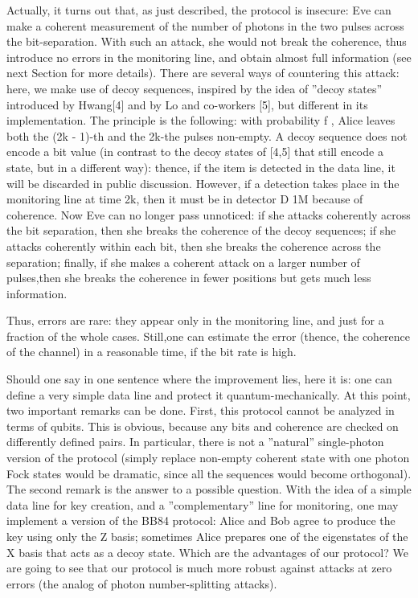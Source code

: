 Actually, it turns out that, as just described, the protocol is insecure: Eve can make a coherent measurement of the number of photons in the two pulses across the bit-separation. With such an attack, she would not break the coherence, thus introduce no errors in the monitoring line, and obtain almost full information (see next Section for more details). There are several ways of countering this attack: here, we make use of decoy sequences, inspired by the idea of ”decoy states” introduced by Hwang[4] and by Lo and co-workers [5], but different in its implementation. The principle is the following: with probability f , Alice leaves both the (2k - 1)-th and the 2k-the pulses non-empty. A decoy sequence does not encode a bit value (in contrast to the decoy states of [4,5] that still encode a state, but in a different way): thence, if the item is detected in the data line, it will be discarded in public discussion. However, if a detection takes place in the monitoring line at time 2k, then it must be in detector D 1M because of coherence. Now Eve can no longer pass unnoticed: if she attacks coherently across the bit separation, then she breaks the coherence of the decoy sequences; if she attacks coherently within each bit, then she breaks the coherence across the separation; finally, if she makes a coherent attack on a larger number of pulses,then she breaks the coherence in fewer positions but gets much less information.

Thus, errors are rare: they appear only in the monitoring line, and just for a fraction of the whole cases. Still,one can estimate the error (thence, the coherence of the channel) in a reasonable time, if the bit rate is high.

Should one say in one sentence where the improvement lies, here it is: one can define a very simple data line and protect it quantum-mechanically. At this point, two important remarks can be done. First, this protocol cannot be analyzed in terms of qubits. This is obvious, because any bits and coherence are checked on differently defined pairs. In particular, there is not a ”natural” single-photon version of the protocol (simply replace non-empty coherent state with one photon Fock states would be dramatic, since all the sequences would become orthogonal). The second remark is the answer to a possible question. With the idea of a simple data line for key creation, and a ”complementary” line for monitoring, one may implement a version of the BB84 protocol: Alice and Bob agree to produce the key using only the Z basis; sometimes Alice prepares one of the eigenstates of the X basis that acts as a decoy state. Which are the advantages of our protocol? We are going to see that our protocol is much more robust against attacks at zero errors (the analog of photon number-splitting attacks).

